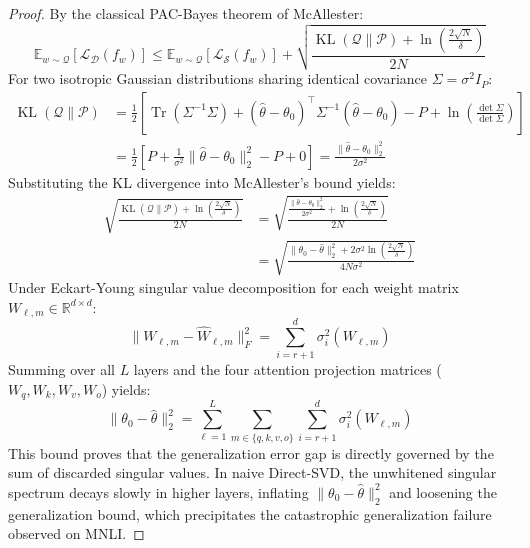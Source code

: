 \documentclass{article}
\begin{document}
\begin{proof}
By the classical PAC-Bayes theorem of McAllester:
\begin{equation}
    \mathbb{E}_{w \sim \mathcal{Q}} \left[ \mathcal{L}_{\mathcal{D}}(f_w) \right] \le \mathbb{E}_{w \sim \mathcal{Q}} \left[ \mathcal{L}_{\mathcal{S}}(f_w) \right] + \sqrt{\frac{\operatorname{KL}(\mathcal{Q} \parallel \mathcal{P}) + \ln\left(\frac{2\sqrt{N}}{\delta}\right)}{2 N}}
\end{equation}
For two isotropic Gaussian distributions sharing identical covariance $\Sigma = \sigma^2 I_P$:
\begin{align}
    \operatorname{KL}(\mathcal{Q} \parallel \mathcal{P}) &= \frac{1}{2} \left[ \operatorname{Tr}(\Sigma^{-1} \Sigma) + (\hat{\theta} - \theta_0)^\top \Sigma^{-1} (\hat{\theta} - \theta_0) - P + \ln\left(\frac{\det \Sigma}{\det \Sigma}\right) \right] \nonumber \\
    &= \frac{1}{2} \left[ P + \frac{1}{\sigma^2} \|\hat{\theta} - \theta_0\|_2^2 - P + 0 \right] = \frac{\|\hat{\theta} - \theta_0\|_2^2}{2 \sigma^2}
\end{align}
Substituting the KL divergence into McAllester's bound yields:
\begin{align}
    \sqrt{\frac{\operatorname{KL}(\mathcal{Q} \parallel \mathcal{P}) + \ln\left(\frac{2\sqrt{N}}{\delta}\right)}{2 N}} &= \sqrt{\frac{\frac{\|\hat{\theta} - \theta_0\|_2^2}{2 \sigma^2} + \ln\left(\frac{2\sqrt{N}}{\delta}\right)}{2 N}} \nonumber \\
    &= \sqrt{\frac{\|\theta_0 - \hat{\theta}\|_2^2 + 2 \sigma^2 \ln\left(\frac{2\sqrt{N}}{\delta}\right)}{4 N \sigma^2}}
\end{align}
Under Eckart-Young singular value decomposition for each weight matrix $W_{\ell, m} \in \mathbb{R}^{d \times d}$:
\begin{equation}
    \|W_{\ell, m} - \hat{W}_{\ell, m}\|_F^2 = \sum_{i=r+1}^d \sigma_i^2(W_{\ell, m})
\end{equation}
Summing over all $L$ layers and the four attention projection matrices ($W_q, W_k, W_v, W_o$) yields:
\begin{equation}
    \|\theta_0 - \hat{\theta}\|_2^2 = \sum_{\ell=1}^L \sum_{m \in \{q, k, v, o\}} \sum_{i=r+1}^d \sigma_i^2(W_{\ell, m})
\end{equation}
This bound proves that the generalization error gap is directly governed by the sum of discarded singular values. In naive Direct-SVD, the unwhitened singular spectrum decays slowly in higher layers, inflating $\|\theta_0 - \hat{\theta}\|_2^2$ and loosening the generalization bound, which precipitates the catastrophic generalization failure observed on MNLI.
\end{proof}
\end{document}
